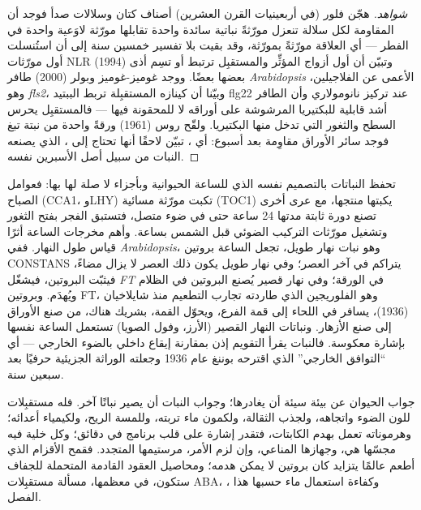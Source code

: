 \begin{proof}[شواهد]
هجّن فلور (في أربعينيات القرن العشرين) أصناف كتان وسلالات
صدأ فوجد أن المقاومة لكل سلالة تنعزل مورّثةً نباتية سائدة
واحدة تقابلها مورّثة لاوَعية واحدة في الفطر --- أي العلاقة
مورّثةً بمورّثة، وقد بقيت بلا تفسير خمسين سنة إلى أن استُنسلت
أول مورّثات NLR (1994) وتبيّن أن أول أزواج المؤثِّر والمستقبِل
ترتبط أو تسِم أذى بعضها بعضًا. ووجد غوميز-غوميز وبولر (2000)
طافر \emph{Arabidopsis} الأعمى عن الفلاجيلين، وهو \emph{fls2}،
وبيّنا أن كينازه المستقبِلة تربط الببتيد flg22 عند تركيز
نانومولاري وأن الطافر أشد قابلية للبكتيريا المرشوشة على
أوراقه لا للمحقونة فيها --- فالمستقبِل يحرس السطح والثغور
التي تدخل منها البكتيريا. ولقّح روس (1961) ورقةً واحدة من
نبتة تبغ  فوجد سائر الأوراق مقاوِمة بعد أسبوع: أي
، تبيّن لاحقًا أنها تحتاج إلى ، الذي يصنعه النبات من سبيل أصل الأسبرين نفسه.
\end{proof}

\begin{example}\label{ex:b3:plant-molecular-physiology:clock}
تحفظ النباتات  بالتصميم نفسه الذي للساعة
الحيوانية وبأجزاء لا صلة لها بها: فعوامل الصباح (CCA1، وLHY)
تكبت مورّثة مسائية (TOC1) يكبتها منتجها، مع عرى أخرى تصنع
دورة ثابتة مدتها 24 ساعة حتى في ضوء متصل، فتستبق الفجر بفتح
الثغور وتشغيل مورّثات التركيب الضوئي قبل الشمس بساعة. وأهم
مخرجات الساعة أثرًا قياس طول النهار. ففي \emph{Arabidopsis}،
وهو نبات نهار طويل، تجعل الساعة بروتين CONSTANS يتراكم في
آخر العصر؛ وفي نهار طويل يكون ذلك العصر لا يزال مضاءً،
فيثبّت   البروتين، فيشغّل \emph{FT} في
الورقة؛ وفي نهار قصير يُصنع البروتين في الظلام ويُهدَم.
وبروتين FT، وهو الفلوريجين الذي طاردته تجارب التطعيم منذ
شايلاخيان (1936)، يسافر في اللحاء إلى قمة الفرع، ويحوّل
القمة، بشريك هناك، من صنع الأوراق إلى صنع الأزهار. ونباتات
النهار القصير (الأرز، وفول الصويا) تستعمل الساعة نفسها
بإشارة معكوسة. فالنبات يقرأ التقويم إذن بمقارنة إيقاع داخلي
بالضوء الخارجي --- أي ``التوافق الخارجي'' الذي اقترحه بوننغ
عام 1936 وجعلته الوراثة الجزيئية حرفيًا بعد سبعين سنة.
\end{example}

\begin{remark}\label{rem:b3:plant-molecular-physiology:remark}
جواب الحيوان عن بيئة سيئة أن يغادرها؛ وجواب النبات أن يصير
نباتًا آخر. فله مستقبِلات للون الضوء واتجاهه، ولجذب الثقالة،
ولكمون ماء تربته، وللمسة الريح، ولكيمياء أعدائه؛ وهرموناته
تعمل بهدم الكابتات، فتقدر إشارة على قلب برنامج في دقائق؛ وكل
خلية فيه مجسّها هي، وجهازها المناعي، وإن لزم الأمر، مرستيمها
المتجدد. فقمح الأقزام الذي أطعم عالمًا يتزايد كان بروتين
 لا يمكن هدمه؛ ومحاصيل العقود القادمة المتحملة للجفاف
ستكون، في معظمها، مسألة مستقبِلات ABA، ، وكفاءة
استعمال ماء حسبها هذا الفصل.
\end{remark}

